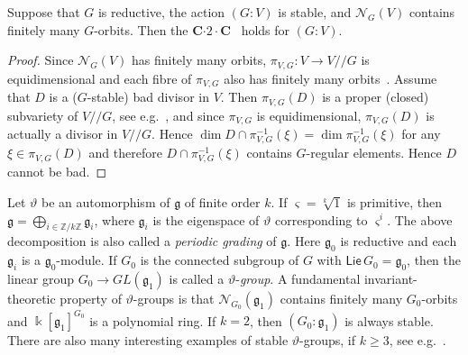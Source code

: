 \begin{prop}   \label{prop:codim2-EQ}
Suppose that $G$ is reductive, the action $(G:V)$ is stable, and ${{\mathcal N}}_G(V)$ contains finitely many 
$G$-orbits. Then the {\textsf{\bfseries C${\cdot}2{\cdot}$C}\ } holds for $(G:V)$.
\end{prop}
\begin{proof}
Since ${{\mathcal N}}_G(V)$ has finitely many orbits,  $\pi_{V,G}: V\to  V{/\!\!/} G$ is equidimensional and each fibre of 
$\pi_{V,G}$ also has finitely many orbits~\cite[\S\,5.2, Cor.\,3]{VP}. Assume that
$D$ is a ($G$-stable) bad divisor in $V$. 
Then $\pi_{V,G}(D)$ is a proper (closed) subvariety of $V{/\!\!/} G$, see e.g.~\cite[Theorem\,1]{tainan}, and 
since $\pi_{V,G}$ is equidimensional, $\pi_{V,G}(D)$ is actually a divisor
in $V{/\!\!/} G$. Hence $\dim D\cap \pi_{V,G}^{-1}(\xi)=\dim  \pi_{V,G}^{-1}(\xi)$ for any $\xi\in \pi_{V,G}(D)$ 
and therefore $D\cap \pi_{V,G}^{-1}(\xi)$ contains $G$-regular elements. Hence $D$ cannot be bad.
\end{proof}

\begin{ex}  \label{theta-1}
Let $\vartheta$ be an automorphism of ${{\mathfrak g}}$ of finite order $k$. If $\varsigma=\sqrt[k]1$ is primitive, then 
${{\mathfrak g}}=\textstyle \bigoplus_{i\in {{\mathbb Z}}/k{{\mathbb Z}}}{{\mathfrak g}}_i$, where ${{\mathfrak g}}_i$ is the eigenspace of $\vartheta$ corresponding 
to $\varsigma^i$. The above decomposition is also called a {\it periodic grading} of ${{\mathfrak g}}$.
Here ${{\mathfrak g}}_0$ is reductive and each ${{\mathfrak g}}_i$ is a ${{\mathfrak g}}_0$-module. If $G_0$ is the connected subgroup of $G$ 
with ${{\mathsf{Lie\,}}} G_0={{\mathfrak g}}_0$, then the linear group $G_0\to GL({{\mathfrak g}}_1)$ is called a $\vartheta$-{\it group}. A 
fundamental invariant-theoretic property of $\vartheta$-groups is that ${{\mathcal N}}_{G_0}({{\mathfrak g}}_1)$ contains finitely 
many $G_0$-orbits and ${\Bbbk}[{{\mathfrak g}}_1]^{G_0}$ is a polynomial ring. If $k=2$, then $(G_0:{{\mathfrak g}}_1)$ is always 
stable. There are also many interesting examples of stable $\vartheta$-groups, if $k{\geqslant} 3$, 
see e.g.~\cite[\S\,9]{vi76}. 
\end{ex}

